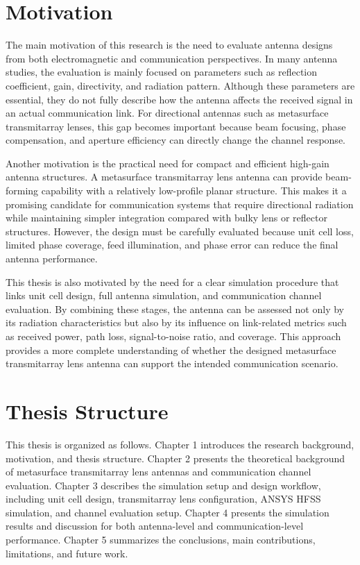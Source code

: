 \section{Motivation}
The main motivation of this research is the need to evaluate antenna designs from both electromagnetic and communication perspectives. In many antenna studies, the evaluation is mainly focused on parameters such as reflection coefficient, gain, directivity, and radiation pattern. Although these parameters are essential, they do not fully describe how the antenna affects the received signal in an actual communication link. For directional antennas such as metasurface transmitarray lenses, this gap becomes important because beam focusing, phase compensation, and aperture efficiency can directly change the channel response.

Another motivation is the practical need for compact and efficient high-gain antenna structures. A metasurface transmitarray lens antenna can provide beam-forming capability with a relatively low-profile planar structure. This makes it a promising candidate for communication systems that require directional radiation while maintaining simpler integration compared with bulky lens or reflector structures. However, the design must be carefully evaluated because unit cell loss, limited phase coverage, feed illumination, and phase error can reduce the final antenna performance.

This thesis is also motivated by the need for a clear simulation procedure that links unit cell design, full antenna simulation, and communication channel evaluation. By combining these stages, the antenna can be assessed not only by its radiation characteristics but also by its influence on link-related metrics such as received power, path loss, signal-to-noise ratio, and coverage. This approach provides a more complete understanding of whether the designed metasurface transmitarray lens antenna can support the intended communication scenario.

\section{Thesis Structure}
This thesis is organized as follows. Chapter 1 introduces the research background, motivation, and thesis structure. Chapter 2 presents the theoretical background of metasurface transmitarray lens antennas and communication channel evaluation. Chapter 3 describes the simulation setup and design workflow, including unit cell design, transmitarray lens configuration, ANSYS HFSS simulation, and channel evaluation setup. Chapter 4 presents the simulation results and discussion for both antenna-level and communication-level performance. Chapter 5 summarizes the conclusions, main contributions, limitations, and future work.
